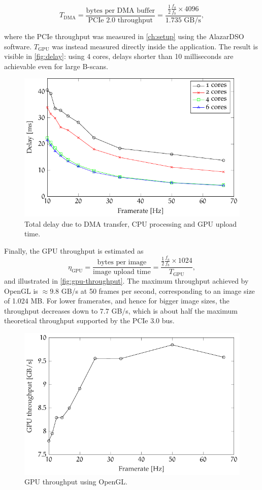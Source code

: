 \begin{equation}
	T_{\text{DMA}} = \frac{\text{bytes per DMA buffer}}{\text{PCIe 2.0 throughput}} = \frac{\frac{1}{2}\frac{f_a}{f_b}\times 4096}{1.735 \text{ GB/s}},
\end{equation} 

where the PCIe throughput was measured in \autoref{ch:setup} using the AlazarDSO software. $T_{\text{GPU}}$ was instead measured directly inside the application. The result is visible in \autoref{fig:delay}: using 4 cores, delays shorter than 10 milliseconds are achievable even for large B-scans. 


\begin{figure}[htb]
	\myfloatalign
	\includegraphics[width=0.8\linewidth]{gfx/ch4/delay}
	\caption{Total delay due to DMA transfer, CPU processing and GPU upload time.}\label{fig:delay}
\end{figure}

Finally, the GPU throughput is estimated as 
\begin{equation}
\eta_{\text{GPU}} = \frac{\text{bytes per image}}{\text{image upload time}} = \frac{\frac{1}{2}\frac{f_a}{f_b} \times 1024}{T_{\text{GPU}}},
\end{equation}
and illustrated in \autoref{fig:gpu-throughput}. The maximum throughput achieved by OpenGL is $\approx 9.8$ GB/s at 50 frames per second, corresponding to an image size of 1.024 MB. For lower framerates, and hence for bigger image sizes, the throughput decreases down to $7.7$ GB/s, which is about half the  maximum theoretical throughput supported by the PCIe 3.0 bus. 
\begin{figure}[htb]
	\myfloatalign
	\includegraphics[width=0.8\linewidth]{gfx/ch4/gpu-throughput}
	\caption{GPU throughput using OpenGL.}\label{fig:gpu-throughput}
\end{figure}


